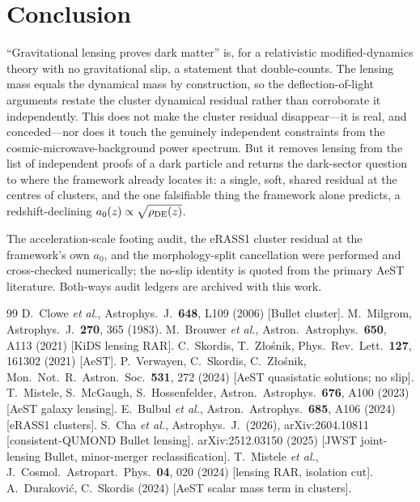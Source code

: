 \documentclass[aps,prd,twocolumn,10pt,nofootinbib,superscriptaddress]{revtex4-2}
\begin{document}
\section{Conclusion}
``Gravitational lensing proves dark matter'' is, for a relativistic modified-dynamics theory with no gravitational
slip, a statement that double-counts. The lensing mass equals the dynamical mass by construction, so the
deflection-of-light arguments restate the cluster dynamical residual rather than corroborate it independently. This
does not make the cluster residual disappear---it is real, and conceded---nor does it touch the genuinely independent
constraints from the cosmic-microwave-background power spectrum. But it removes lensing from the list of independent
proofs of a dark particle and returns the dark-sector question to where the framework already locates it: a single,
soft, shared residual at the centres of clusters, and the one falsifiable thing the framework alone predicts, a
redshift-declining $a_0(z)\propto\sqrt{\rho_{\rm DE}(z)}$.

\begin{acknowledgments}
The acceleration-scale footing audit, the eRASS1 cluster residual at the framework's own $a_0$, and the morphology-split
cancellation were performed and cross-checked numerically; the no-slip identity is quoted from the primary AeST
literature. Both-ways audit ledgers are archived with this work.
\end{acknowledgments}

\begin{thebibliography}{99}
 D.~Clowe \emph{et al.}, Astrophys.\ J.\ \textbf{648}, L109 (2006) [Bullet cluster].
 M.~Milgrom, Astrophys.\ J.\ \textbf{270}, 365 (1983).
 M.~Brouwer \emph{et al.}, Astron.\ Astrophys.\ \textbf{650}, A113 (2021) [KiDS lensing RAR].
 C.~Skordis, T.~Z\l o\'snik, Phys.\ Rev.\ Lett.\ \textbf{127}, 161302 (2021) [AeST].
 P.~Verwayen, C.~Skordis, C.~Z\l o\'snik, Mon.\ Not.\ R.\ Astron.\ Soc.\ \textbf{531}, 272 (2024)
[AeST quasistatic solutions; no slip].
 T.~Mistele, S.~McGaugh, S.~Hossenfelder, Astron.\ Astrophys.\ \textbf{676}, A100 (2023)
[AeST galaxy lensing].
 E.~Bulbul \emph{et al.}, Astron.\ Astrophys.\ \textbf{685}, A106 (2024) [eRASS1 clusters].
 S.~Cha \emph{et al.}, Astrophys.\ J.\ (2026), arXiv:2604.10811 [consistent-QUMOND Bullet lensing].
 arXiv:2512.03150 (2025) [JWST joint-lensing Bullet, minor-merger reclassification].
 T.~Mistele \emph{et al.}, J.\ Cosmol.\ Astropart.\ Phys.\ \textbf{04}, 020 (2024)
[lensing RAR, isolation cut].
 A.~Durakovi\'c, C.~Skordis (2024) [AeST scalar mass term in clusters].
\end{thebibliography}
\end{document}
